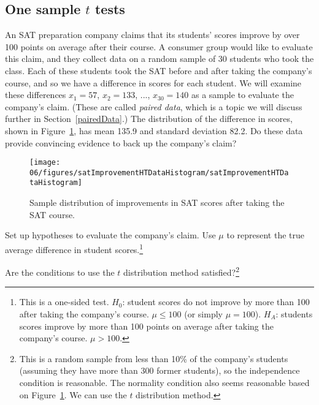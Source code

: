 \subsection{One sample $t$ tests}
\label{oneSampleTTests}

An SAT preparation company claims that its students' scores improve by over 100 points on average after their course. A consumer group would like to evaluate this claim, and they collect data on a random sample of 30 students who took the class. Each of these students took the SAT before and after taking the company's course, and so we have a difference in scores for each student. We will examine these differences $x_1=57$, $x_2=133$, ..., $x_{30}=140$ as a sample to evaluate the company's claim. 
(These are called \emph{paired data}, which is a topic we will discuss further in Section~\ref{pairedData}.) 
The distribution of the difference in scores, shown in Figure~\ref{satImprovementHTDataHistogram}, has mean 135.9 and standard deviation 82.2. Do these data provide convincing evidence to back up the company's claim? 

\begin{figure}
\centering
\texttt{[image: 06/figures/satImprovementHTDataHistogram/satImprovementHTDataHistogram]}
\caption{Sample distribution of improvements in SAT scores after taking the SAT course.}
\label{satImprovementHTDataHistogram}
\end{figure}

\begin{exercise}
Set up hypotheses to evaluate the company's claim. Use $\mu$ to represent the true average difference in student scores.\footnote{This is a one-sided test. $H_0$: student scores do not improve by more than 100 after taking the company's course. $\mu \leq 100$ (or simply $\mu = 100$). $H_A$: students scores improve by more than 100 points on average after taking the company's course. $\mu > 100$.}
\end{exercise}

\begin{exercise}
Are the conditions to use the $t$ distribution method satisfied?\footnote{This is a random sample from less than 10\% of the company's students (assuming they have more than 300 former students), so the independence condition is reasonable. The normality condition also seems reasonable based on Figure~\ref{satImprovementHTDataHistogram}. We can use the $t$ distribution method.}
\end{exercise}

